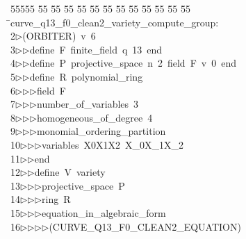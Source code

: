 %
%
\begin{tabbing}
55555 \= 55 \= 55 \= 55 \= 55 \= 55 \= 55 \= 55 \= 55 \= 55 \= 55 \= 55 \= 55 \= \>curve\_q13\_f0\_clean2\_variety\_compute\_group:\\[0pt]
2\>$\triangleright$\>(ORBITER)\ v\ 6\ \\[0pt]
3\>$\triangleright$\>$\triangleright$\>define\ F\ finite\_field\ q\ 13\ end\ \\[0pt]
4\>$\triangleright$\>$\triangleright$\>define\ P\ projective\_space\ n\ 2\ field\ F\ v\ 0\ end\ \\[0pt]
5\>$\triangleright$\>$\triangleright$\>define\ R\ polynomial\_ring\ \\[0pt]
6\>$\triangleright$\>$\triangleright$\>$\triangleright$\>field\ F\ \\[0pt]
7\>$\triangleright$\>$\triangleright$\>$\triangleright$\>number\_of\_variables\ 3\ \\[0pt]
8\>$\triangleright$\>$\triangleright$\>$\triangleright$\>homogeneous\_of\_degree\ 4\ \\[0pt]
9\>$\triangleright$\>$\triangleright$\>$\triangleright$\>monomial\_ordering\_partition\ \\[0pt]
10\>$\triangleright$\>$\triangleright$\>$\triangleright$\>variables\ X0X1X2\ X\_0X\_1X\_2\ \\[0pt]
11\>$\triangleright$\>$\triangleright$\>end\ \\[0pt]
12\>$\triangleright$\>$\triangleright$\>define\ V\ variety\ \\[0pt]
13\>$\triangleright$\>$\triangleright$\>$\triangleright$\>projective\_space\ P\ \\[0pt]
14\>$\triangleright$\>$\triangleright$\>$\triangleright$\>ring\ R\ \\[0pt]
15\>$\triangleright$\>$\triangleright$\>$\triangleright$\>equation\_in\_algebraic\_form\ \\[0pt]
16\>$\triangleright$\>$\triangleright$\>$\triangleright$\>$\triangleright$\>(CURVE\_Q13\_F0\_CLEAN2\_EQUATION)\ \\[0pt]

\end{tabbing}
